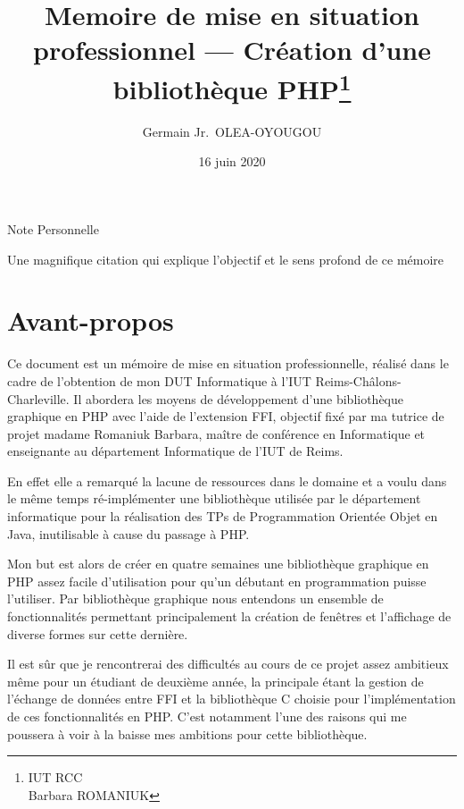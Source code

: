\documentclass[11pt,a4paper,krantz2,11pt,oneside]{krantz}
\title{Memoire de mise en situation professionnel --- Création d'une bibliothèque PHP\thanks{IUT RCC\\
Barbara ROMANIUK}}
\author{Germain Jr.~OLEA-OYOUGOU}
\date{16 juin 2020}
\begin{document}
\maketitle

\thispagestyle{empty}
\begin{center}
\Large{Note Personnelle}

\large{Une magnifique citation qui explique l'objectif et le sens profond de ce mémoire}
\end{center}

\setlength{\abovedisplayskip}{-5pt}
\setlength{\abovedisplayshortskip}{-5pt}

{
\hypersetup{linkcolor=}
\setcounter{tocdepth}{1}
\tableofcontents
}
\listoftables
\listoffigures
\hypertarget{avant-propos}{%
\chapter*{Avant-propos}\label{avant-propos}}


Ce document est un mémoire de mise en situation professionnelle, réalisé dans le cadre de l'obtention de mon DUT Informatique à l'IUT Reims-Châlons-Charleville. Il abordera les moyens de développement d'une bibliothèque graphique en PHP avec l'aide de l'extension FFI, objectif fixé par ma tutrice de projet madame Romaniuk Barbara, maître de conférence en Informatique et enseignante au département Informatique de l'IUT de Reims.

En effet elle a remarqué la lacune de ressources dans le domaine et a voulu dans le même temps ré-implémenter une bibliothèque utilisée par le département informatique pour la réalisation des TPs de Programmation Orientée Objet en Java, inutilisable à cause du passage à PHP.

Mon but est alors de créer en quatre semaines une bibliothèque graphique en PHP assez facile d'utilisation pour qu'un débutant en programmation puisse l'utiliser. Par bibliothèque graphique nous entendons un ensemble de fonctionnalités permettant principalement la création de fenêtres et l'affichage de diverse formes sur cette dernière.

Il est sûr que je rencontrerai des difficultés au cours de ce projet assez ambitieux même pour un étudiant de deuxième année, la principale étant la gestion de l'échange de données entre FFI et la bibliothèque C choisie pour l'implémentation de ces fonctionnalités en PHP. C'est notamment l'une des raisons qui me poussera à voir à la baisse mes ambitions pour cette bibliothèque.
\end{document}
